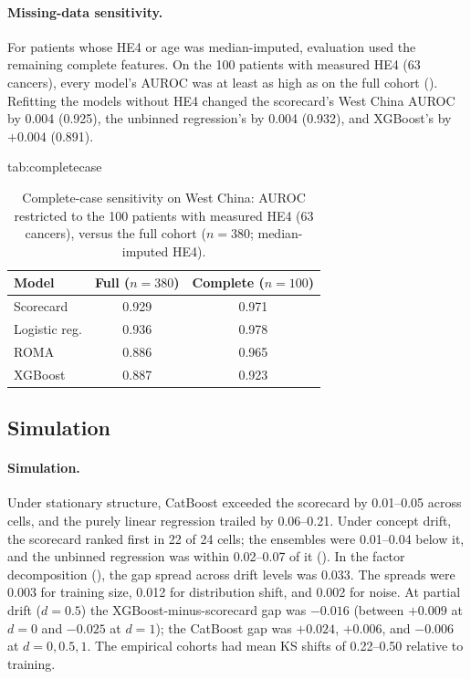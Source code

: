 \documentclass[pmlr,twocolumn,10pt]{jmlr} %
\begin{document}
\paragraph{Missing-data sensitivity.} For patients whose HE4 or age was median-imputed, evaluation used the
remaining complete features. On the 100 patients with measured
HE4 (63 cancers), every model's AUROC was at least as high as on the full
cohort (). Refitting the models without
HE4 changed the scorecard's West China AUROC by 0.004 (0.925), the
unbinned regression's by 0.004 (0.932), and XGBoost's by $+0.004$ (0.891).

\begin{table}[htbp]
\floatconts
  {tab:completecase}
  {\caption{Complete-case sensitivity on West China: AUROC restricted to
   the 100 patients with measured HE4 (63 cancers), versus the full cohort
   ($n=380$; median-imputed HE4).}}
  {\setlength{\tabcolsep}{3pt}\begin{tabular}{lcc}
  \toprule
  Model & Full ($n{=}380$) & Complete ($n{=}100$)\\
  \midrule
  Scorecard & 0.929 & 0.971\\
  Logistic reg. & 0.936 & 0.978\\
  ROMA & 0.886 & 0.965\\
  XGBoost & 0.887 & 0.923\\
  \bottomrule
  \end{tabular}}
\end{table}

\subsection{Simulation}

\paragraph{Simulation.} Under stationary structure, CatBoost exceeded the
scorecard by 0.01--0.05 across cells, and the purely linear regression
trailed by 0.06--0.21. Under concept drift, the scorecard ranked first in
22 of 24 cells; the ensembles were 0.01--0.04 below it, and the unbinned
regression was within 0.02--0.07 of it (). In the
factor decomposition (), the gap spread across drift
levels was 0.033. The spreads were 0.003 for training size, 0.012 for
distribution shift, and 0.002 for noise. At partial drift ($d=0.5$) the
XGBoost-minus-scorecard gap was $-0.016$ (between $+0.009$ at $d=0$ and
$-0.025$ at $d=1$); the CatBoost gap was $+0.024$, $+0.006$, and $-0.006$
at $d=0,0.5,1$. The empirical cohorts had mean KS shifts of
0.22--0.50 relative to training.
\end{document}
